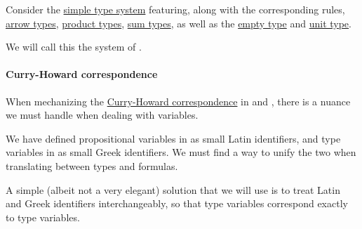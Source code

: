 \begin{definition}\label{def:simple_algebraic_types}\mimprovised
  Consider the \hyperref[def:simple_type_system]{simple type system} featuring, along with the corresponding rules, \hyperref[def:arrow_type]{arrow types}, \hyperref[def:simple_product_type]{product types}, \hyperref[def:simple_product_type]{sum types}, as well as the \hyperref[def:simple_empty_type]{empty type} and \hyperref[def:simple_unit_type]{unit type}.

  We will call this the system of .
\end{definition}

\paragraph{Curry-Howard correspondence}

\begin{remark}\label{rem:curry_howard_variables}
  When mechanizing the \hyperref[con:curry_howard_correspondence]{Curry-Howard correspondence} in  and , there is a nuance we must handle when dealing with variables.

  We have defined propositional variables in  as small Latin identifiers, and type variables in  as small Greek identifiers. We must find a way to unify the two when translating between types and formulas.

  A simple (albeit not a very elegant) solution that we will use is to treat Latin and Greek identifiers interchangeably, so that type variables correspond exactly to type variables.
\end{remark}

